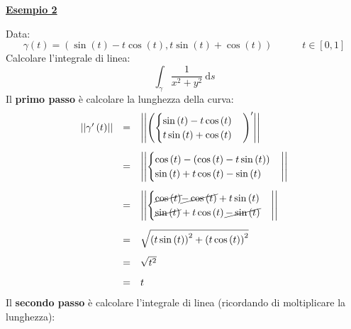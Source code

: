 \documentclass[a4paper]{article}
\newcommand{\example}[1]{\textcolor{Green4}{\textbf{#1}}}
\begin{document}
	\begin{flushleft}
		\example{\underline{Esempio 2}}
	\end{flushleft}
	Data:
	\begin{equation*}
		\gamma\left(t\right) = \left(\sin\left(t\right) - t\cos\left(t\right), t\sin\left(t\right)+\cos\left(t\right)\right) \hspace{3em} t \in \left[0, 1\right]
	\end{equation*}
	Calcolare l'integrale di linea:
	\begin{equation*}
		\displaystyle\int_{\gamma} \dfrac{1}{x^{2}+y^{2}} \:\mathrm{d}s
	\end{equation*}
	Il \textbf{primo passo} è calcolare la lunghezza della curva:
	\begin{equation*}
		\begin{array}{rcl}
			\left|\left| \gamma'\left(t\right) \right|\right| 
			&=&
			\left|\left|\left( \begin{cases}
				\sin\left(t\right) - t\cos\left(t\right) \\
				t\sin\left(t\right) + \cos\left(t\right)
			\end{cases} \right)'\right|\right| \\ [1.8em]
			&=&
			\left|\left| \begin{cases}
				\cos\left(t\right) - \left(\cos\left(t\right) - t\sin\left(t\right)\right) \\
				\sin\left(t\right) + t\cos\left(t\right) - \sin\left(t\right)
			\end{cases} \right|\right| \\ [1.8em]
			&=&
			\left|\left| \begin{cases}
				\cancel{\cos\left(t\right)} \cancel{- \cos\left(t\right)} + t\sin\left(t\right) \\
				\cancel{\sin\left(t\right)} + t\cos\left(t\right) \cancel{- \sin\left(t\right)}
			\end{cases} \right|\right| \\ [1.8em]
			&=&
			\sqrt{\left(t\sin\left(t\right)\right)^{2} + \left(t\cos\left(t\right)\right)^{2}} \\ [1em]
			&=&
			\sqrt{t^{2}} \\ [.8em]
			&=&
			t
		\end{array}
	\end{equation*}
	Il \textbf{secondo passo} è calcolare l'integrale di linea (ricordando di moltiplicare la lunghezza):
\end{document}
